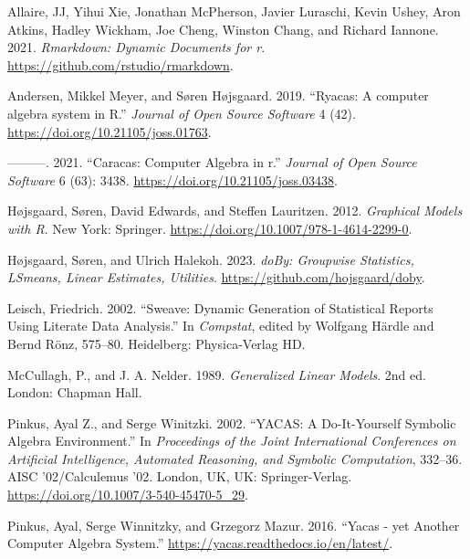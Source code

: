 \hypertarget{refs}{}
\begin{CSLReferences}{1}{0}
\leavevmode{}%
Allaire, JJ, Yihui Xie, Jonathan McPherson, Javier Luraschi, Kevin Ushey, Aron Atkins, Hadley Wickham, Joe Cheng, Winston Chang, and Richard Iannone. 2021. \emph{Rmarkdown: Dynamic Documents for r}. \url{https://github.com/rstudio/rmarkdown}.

\leavevmode{}%
Andersen, Mikkel Meyer, and Søren Højsgaard. 2019. {``{Ryacas: A computer algebra system in R}.''} \emph{Journal of Open Source Software} 4 (42). \url{https://doi.org/10.21105/joss.01763}.

\leavevmode{}%
---------. 2021. {``Caracas: Computer Algebra in r.''} \emph{Journal of Open Source Software} 6 (63): 3438. \url{https://doi.org/10.21105/joss.03438}.

\leavevmode{}%
Højsgaard, Søren, David Edwards, and Steffen Lauritzen. 2012. \emph{Graphical Models with {R}}. New York: Springer. \url{https://doi.org/10.1007/978-1-4614-2299-0}.

\leavevmode{}%
Højsgaard, Søren, and Ulrich Halekoh. 2023. \emph{{doBy: Groupwise Statistics, LSmeans, Linear Estimates, Utilities}}. \url{https://github.com/hojsgaard/doby}.

\leavevmode{}%
Leisch, Friedrich. 2002. {``Sweave: Dynamic Generation of Statistical Reports Using Literate Data Analysis.''} In \emph{Compstat}, edited by Wolfgang Härdle and Bernd Rönz, 575--80. Heidelberg: Physica-Verlag HD.

\leavevmode{}%
McCullagh, P., and J. A. Nelder. 1989. \emph{Generalized Linear Models}. 2nd ed. London: Chapman Hall.

\leavevmode{}%
Pinkus, Ayal Z., and Serge Winitzki. 2002. {``{YACAS: A Do-It-Yourself Symbolic Algebra Environment}.''} In \emph{Proceedings of the Joint International Conferences on Artificial Intelligence, Automated Reasoning, and Symbolic Computation}, 332--36. AISC '02/Calculemus '02. London, UK, UK: Springer-Verlag. \url{https://doi.org/10.1007/3-540-45470-5_29}.

\leavevmode{}%
Pinkus, Ayal, Serge Winnitzky, and Grzegorz Mazur. 2016. {``Yacas - yet Another Computer Algebra System.''} \url{https://yacas.readthedocs.io/en/latest/}.


\end{CSLReferences}
